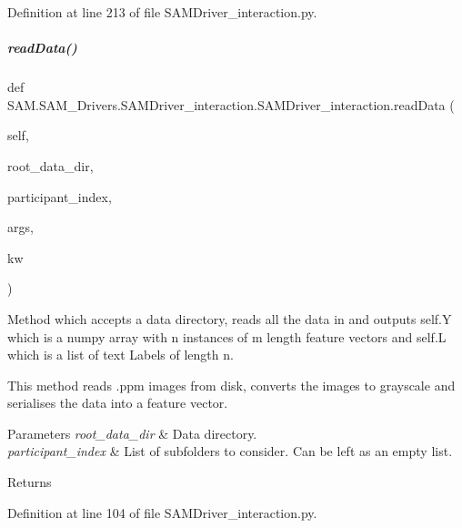 Definition at line 213 of file S\+A\+M\+Driver\+\_\+interaction.\+py.

\mbox{\label{group__icubclient__SAM__Drivers_ab9458625bb39c7575a96e7ccc63c8660}} 
\subparagraph{\texorpdfstring{read\+Data()}{readData()}}
{\footnotesize\ttfamily def S\+A\+M.\+S\+A\+M\+\_\+\+Drivers.\+S\+A\+M\+Driver\+\_\+interaction.\+S\+A\+M\+Driver\+\_\+interaction.\+read\+Data (\begin{DoxyParamCaption}\item[{}]{self,  }\item[{}]{root\+\_\+data\+\_\+dir,  }\item[{}]{participant\+\_\+index,  }\item[{}]{args,  }\item[{}]{kw }\end{DoxyParamCaption})}



Method which accepts a data directory, reads all the data in and outputs self.\+Y which is a numpy array with n instances of m length feature vectors and self.\+L which is a list of text Labels of length n. 

This method reads .ppm images from disk, converts the images to grayscale and serialises the data into a feature vector.


\begin{DoxyParams}{Parameters}
{\em root\+\_\+data\+\_\+dir} & Data directory. \\
\hline
{\em participant\+\_\+index} & List of subfolders to consider. Can be left as an empty list.\\
\hline
\end{DoxyParams}
\begin{DoxyReturn}{Returns}

\end{DoxyReturn}


Definition at line 104 of file S\+A\+M\+Driver\+\_\+interaction.\+py.

